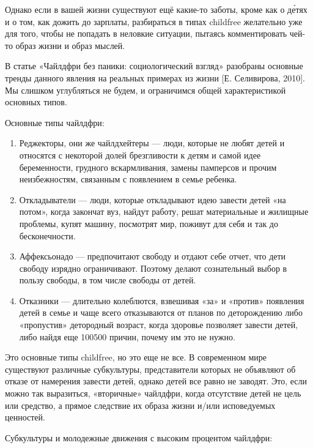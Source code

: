 Однако если в вашей жизни существуют ещё какие-то заботы, кроме как о д\'{е}тях и о том, как дожить до зарплаты, разбираться в типах childfree желательно уже для того, чтобы не попадать в неловкие ситуации, пытаясь комментировать чей-то образ жизни и образ мыслей.

В статье «Чайлдфри без паники: социологический взгляд» разобраны основные тренды данного явления на реальных примерах из жизни [Е. Селивирова, 2010]. Мы слишком углубляться не будем, и ограничимся общей характеристикой основных типов.

Основные типы чайлдфри:
\begin{enumerate}
    \item Реджекторы, они же чайлдхейтеры --- люди, которые не любят детей и относятся с некоторой долей брезгливости к детям и самой идее беременности, грудного вскармливания, замены памперсов и прочим неизбежностям, связанным с появлением в семье ребенка.
    \item Откладыватели --- люди, которые откладывают идею завести детей «на потом», когда закончат вуз, найдут работу, решат материальные и жилищные проблемы, купят машину, посмотрят мир, поживут для себя и так до бесконечности.
    \item Аффексьонадо --- предпочитают свободу и отдают себе отчет, что дети свободу изрядно ограничивают. Поэтому делают сознательный выбор в пользу свободы, в том числе свободы от детей.
    \item Отказники --- длительно колеблются, взвешивая «за» и «против» появления детей в семье и чаще всего отказываются от планов по деторождению либо «пропустив» детородный возраст, когда здоровье позволяет завести детей, либо найдя еще 100500 причин, почему им это не нужно.
\end{enumerate}

Это основные типы childfree, но это еще не все. В современном мире существуют различные субкультуры, представители которых не объявляют об отказе от намерения завести детей, однако детей все равно не заводят. Это, если можно так выразиться, «вторичные» чайлдфри, когда отсутствие детей не цель или средство, а прямое следствие их образа жизни и/или исповедуемых ценностей.

Субкультуры и молодежные движения с высоким процентом чайлдфри:


